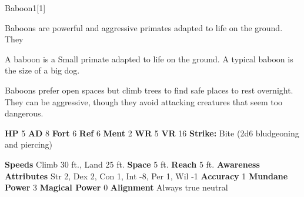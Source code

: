   \begin{monsection}{Baboon}{1}[1]
    \vspace{-1em}\vspace{-1em}
    \vspace{0em}

    
      Baboons are powerful and aggressive primates adapted to life on the ground.
      They
    
        A baboon is a Small primate adapted to life on the ground.
        A typical baboon is the size of a big dog.
      
        Baboons prefer open spaces but climb trees to find safe places to rest overnight.
        They can be aggressive, though they avoid attacking creatures that seem too dangerous.
      

    \begin{spellcontent}
      \begin{spelltargetinginfo}
        \pari \textbf{HP} 5 \monsep
          \textbf{AD} 8 \monsep
          \textbf{Fort} 6 \monsep
          \textbf{Ref} 6 \monsep
          \textbf{Ment} 2
        \pari \textbf{WR} 5 \monsep
        \textbf{VR} 16
        \pari \textbf{Strike:}
            Bite  (2d6 bludgeoning and piercing)
      \end{spelltargetinginfo}
    \end{spellcontent}
    \begin{monsterfooter}
      \pari \textbf{Speeds} Climb 30 ft., Land 25 ft. \monsep
        \textbf{Space} 5 ft. \monsep
        \textbf{Reach} 5 ft.
      \pari \textbf{Awareness} 
      \pari \textbf{Attributes}
        Str 2, Dex 2,
        Con 1, Int -8,
        Per 1, Wil -1
      \pari \textbf{Accuracy} 1 \monsep
        \textbf{Mundane Power} 3 \monsep
      \textbf{Magical Power} 0
      \pari \textbf{Alignment} Always true neutral
    \end{monsterfooter}
  \end{monsection}
  
